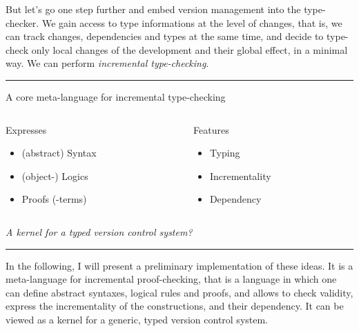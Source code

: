 \documentclass[12pt]{article} \usepackage{beamerarticle} \usepackage{fullpage}
\begin{document}
But let's go one step further and embed version management into the
type-checker. We gain access to type informations at the level of
changes, that is, we can track changes, dependencies and types at the
same time, and decide to type-check only local changes of the
development and their global effect, in a minimal way. We can perform
\emph{incremental type-checking}.

\hrule
\begin{frame}{A core meta-language for incremental type-checking}
  \begin{columns}[t]
    \begin{column}{0.5\textwidth}
      \begin{block}{Expresses}
        \begin{itemize}
        \item (abstract) Syntax
        \item (object-) Logics
        \item Proofs (-terms)
        \end{itemize}
      \end{block}
    \end{column}
    \begin{column}{0.5\textwidth}
      \begin{block}{Features}
        \begin{itemize}
        \item Typing
        \item Incrementality
        \item Dependency
        \end{itemize}
      \end{block}
    \end{column}
  \end{columns}
  \vspace{2em}
  \begin{center}
    \emph{A kernel for a typed version control system?}
  \end{center}
\end{frame}
\hrule

In the following, I will present a preliminary implementation of these
ideas. It is a meta-language for incremental proof-checking, that is a
language in which one can define abstract syntaxes, logical rules and
proofs, and allows to check validity, express the incrementality of
the constructions, and their dependency. It can be viewed as a kernel
for a generic, typed version control system.
\end{document}
